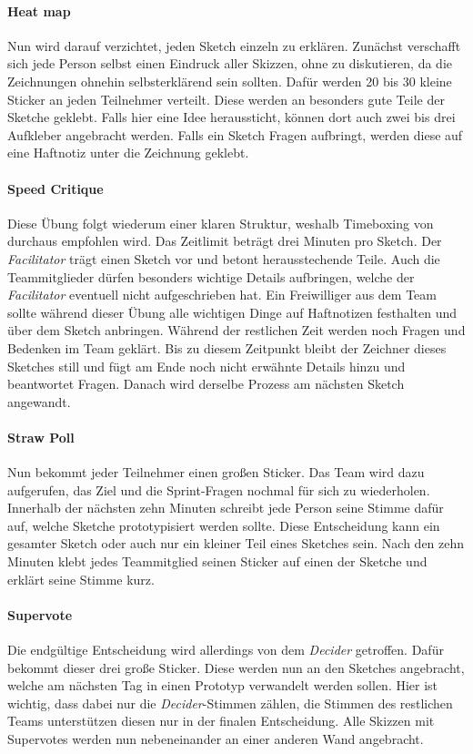 \paragraph{Heat map}
\label{sec:Sprint-Tag3-Heatmap}
Nun wird darauf verzichtet, jeden Sketch einzeln zu erklären. Zunächst verschafft sich jede Person selbst einen Eindruck aller Skizzen, ohne zu diskutieren, da die Zeichnungen ohnehin selbsterklärend sein sollten. Dafür werden 20 bis 30 kleine Sticker an jeden Teilnehmer verteilt. Diese werden an besonders gute Teile der Sketche geklebt. Falls hier eine Idee heraussticht, können dort auch zwei bis drei Aufkleber angebracht werden. Falls ein Sketch Fragen aufbringt, werden diese auf eine Haftnotiz unter die Zeichnung geklebt.

\paragraph{Speed Critique}
\label{sec:Sprint-Tag3-SpeedCritique}
Diese Übung folgt wiederum einer klaren Struktur, weshalb Timeboxing von \citeauthor{Sprint} durchaus empfohlen wird. Das Zeitlimit beträgt drei Minuten pro Sketch. Der \textit{Facilitator} trägt einen Sketch vor und betont herausstechende Teile. Auch die Teammitglieder dürfen besonders wichtige Details aufbringen, welche der \textit{Facilitator} eventuell nicht aufgeschrieben hat. Ein Freiwilliger aus dem Team sollte während dieser Übung alle wichtigen Dinge auf Haftnotizen festhalten und über dem Sketch anbringen. Während der restlichen Zeit werden noch Fragen und Bedenken im Team geklärt. Bis zu diesem Zeitpunkt bleibt der Zeichner dieses Sketches still und fügt am Ende noch nicht erwähnte Details hinzu und beantwortet Fragen. Danach wird derselbe Prozess am nächsten Sketch angewandt.

\paragraph{Straw Poll}
\label{sec:Sprint-Tag3-StrawPoll}
Nun bekommt jeder Teilnehmer einen großen Sticker. Das Team wird dazu aufgerufen, das Ziel und die Sprint-Fragen nochmal für sich zu wiederholen. Innerhalb der nächsten zehn Minuten schreibt jede Person seine Stimme dafür auf, welche Sketche prototypisiert werden sollte. Diese Entscheidung kann ein gesamter Sketch oder auch nur ein kleiner Teil eines Sketches sein. Nach den zehn Minuten klebt jedes Teammitglied seinen Sticker auf einen der Sketche und erklärt seine Stimme kurz.

\paragraph{Supervote}
\label{sec:Sprint-Tag3-Supervote}
Die endgültige Entscheidung wird allerdings von dem \textit{Decider} getroffen. Dafür bekommt dieser drei große Sticker. Diese werden nun an den Sketches angebracht, welche am nächsten Tag in einen Prototyp verwandelt werden sollen. Hier ist wichtig, dass dabei nur die \textit{Decider}-Stimmen zählen, die Stimmen des restlichen Teams unterstützen diesen nur in der finalen Entscheidung. Alle Skizzen mit Supervotes werden nun nebeneinander an einer anderen Wand angebracht.

